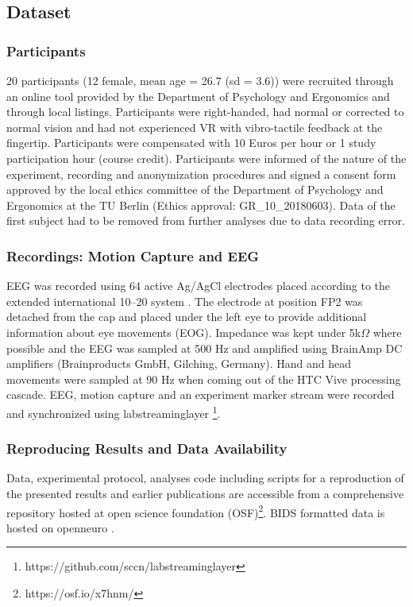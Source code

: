 
\subsection{Dataset}

\subsubsection{Participants}
20 participants (12 female, mean age = 26.7 (sd = 3.6)) were recruited through an online tool provided by the Department of Psychology and Ergonomics and through local listings. Participants were right-handed, had normal or corrected to normal vision and had not experienced VR with vibro-tactile feedback at the fingertip. Participants were compensated with 10 Euros per hour or 1 study participation hour (course credit). Participants were informed of the nature of the experiment, recording and anonymization procedures and signed a consent form approved by the local ethics committee of the Department of Psychology and Ergonomics at the TU Berlin (Ethics approval: GR\_10\_20180603). Data of the first subject had to be removed from further analyses due to data recording error.

\subsubsection{Recordings: Motion Capture and EEG}
EEG was recorded using 64 active Ag/AgCl electrodes placed according to the extended international 10–20 system \cite{Chatrian1985-ys}. The electrode at position FP2 was detached from the cap and placed under the left eye to provide additional information about eye movements (EOG). Impedance was kept under 5k$\Omega$ where possible and the EEG was sampled at 500 Hz and amplified using BrainAmp DC amplifiers (Brainproducts GmbH, Gilching, Germany). Hand and head movements were sampled at 90 Hz when coming out of the HTC Vive processing cascade. EEG, motion capture and an experiment marker stream were recorded and synchronized using labstreaminglayer \footnote{https://github.com/sccn/labstreaminglayer}.

\subsubsection{Reproducing Results and Data Availability}
Data, experimental protocol, analyses code including scripts for a reproduction of the presented results and earlier publications are accessible from a comprehensive repository hosted at open science foundation (OSF)\footnote{https://osf.io/x7hnm/}. BIDS formatted data is hosted on openneuro \cite{ds003846:1.0.0}.

